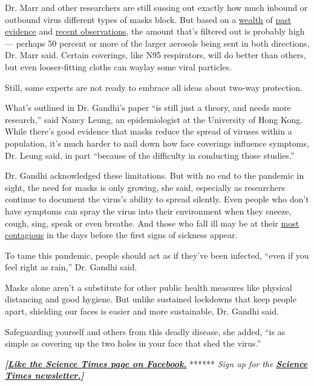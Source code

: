 Dr. Marr and other researchers are still sussing out exactly how much
inbound or outbound virus different types of masks block. But based on a
\href{https://journals.plos.org/plosone/article?id=10.1371/journal.pone.0002618}{wealth}
of \href{https://www.nature.com/articles/s41591-020-0843-2}{past
evidence} and
\href{https://www.thelancet.com/journals/lancet/article/PIIS0140-6736(20)31142-9/fulltext\#\%20}{recent
observations}, the amount that's filtered out is probably high ---
perhaps 50 percent or more of the larger aerosols being sent in both
directions, Dr. Marr said. Certain coverings, like N95 respirators, will
do better than others, but even looser-fitting cloths can waylay some
viral particles.

Still, some experts are not ready to embrace all ideas about two-way
protection.

What's outlined in Dr. Gandhi's paper ``is still just a theory, and
needs more research,'' said Nancy Leung, an epidemiologist at the
University of Hong Kong. While there's good evidence that masks reduce
the spread of viruses within a population, it's much harder to nail down
how face coverings influence symptoms, Dr. Leung said, in part ``because
of the difficulty in conducting those studies.''

Dr. Gandhi acknowledged these limitations. But with no end to the
pandemic in sight, the need for masks is only growing, she said,
especially as researchers continue to document the virus's ability to
spread silently. Even people who don't have symptoms can spray the virus
into their environment when they sneeze, cough, sing, speak or even
breathe. And those who fall ill may be at their
\href{https://www.nature.com/articles/s41591-020-0869-5}{most
contagious} in the days before the first signs of sickness appear.

To tame this pandemic, people should act as if they've been infected,
``even if you feel right as rain,'' Dr. Gandhi said.

Masks alone aren't a substitute for other public health measures like
physical distancing and good hygiene. But unlike sustained lockdowns
that keep people apart, shielding our faces is easier and more
sustainable, Dr. Gandhi said.

Safeguarding yourself and others from this deadly disease, she added,
``is as simple as covering up the two holes in your face that shed the
virus.''

\textbf{\emph{{[}}\href{http://on.fb.me/1paTQ1h}{\emph{Like the Science
Times page on Facebook.}}} ****** \emph{\textbar{} Sign up for the}
\textbf{\href{http://nyti.ms/1MbHaRU}{\emph{Science Times
newsletter.}}\emph{{]}}}

